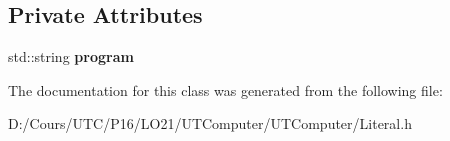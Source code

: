 \subsection*{Private Attributes}
\begin{DoxyCompactItemize}
\item 
std\+::string {\bfseries program}\hypertarget{class_program_literal_a85093db30df36b13a6f435a5856ffa3f}{}\label{class_program_literal_a85093db30df36b13a6f435a5856ffa3f}

\end{DoxyCompactItemize}


The documentation for this class was generated from the following file\+:\begin{DoxyCompactItemize}
\item 
D\+:/\+Cours/\+U\+T\+C/\+P16/\+L\+O21/\+U\+T\+Computer/\+U\+T\+Computer/Literal.\+h\end{DoxyCompactItemize}
